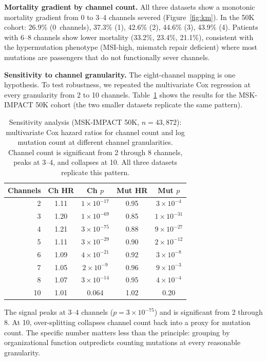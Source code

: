 \documentclass[11pt]{article}
\begin{document}
\textbf{Mortality gradient by channel count.} All three datasets
show a monotonic mortality gradient from 0 to 3--4 channels
severed (Figure~\ref{fig:km}). In the 50K cohort: 26.9\% (0~channels), 37.3\% (1),
42.6\% (2), 44.6\% (3), 43.9\% (4). Patients with 6--8 channels
show lower mortality (33.2\%, 23.4\%, 21.1\%), consistent with the
hypermutation phenotype (MSI-high, mismatch repair deficient) where
most mutations are passengers that do not functionally sever channels.

\textbf{Sensitivity to channel granularity.} The eight-channel mapping
is one hypothesis. To test robustness, we repeated the multivariate
Cox regression at every granularity from 2 to 10 channels.
Table~\ref{tab:sensitivity} shows the results for the MSK-IMPACT
50K cohort (the two smaller datasets replicate the same pattern).

\begin{table}[ht]
\centering
\caption{Sensitivity analysis (MSK-IMPACT 50K, $n = 43{,}872$):
multivariate Cox hazard ratios for channel count and log mutation
count at different channel granularities. Channel count is
significant from 2 through 8 channels, peaks at 3--4, and collapses
at 10. All three datasets replicate this pattern.}
\label{tab:sensitivity}
\medskip
\begin{tabular*}{\textwidth}{@{\extracolsep{\fill}}rcccc@{}}
\toprule
Channels & Ch HR & Ch $p$ & Mut HR & Mut $p$ \\
\midrule
2 & 1.11 & $1 \times 10^{-17}$ & 0.95 & $3 \times 10^{-4}$ \\
3 & 1.20 & $1 \times 10^{-69}$ & 0.85 & $1 \times 10^{-31}$ \\
4 & 1.21 & $3 \times 10^{-75}$ & 0.88 & $9 \times 10^{-27}$ \\
5 & 1.11 & $3 \times 10^{-29}$ & 0.90 & $2 \times 10^{-12}$ \\
6 & 1.09 & $4 \times 10^{-21}$ & 0.92 & $3 \times 10^{-8}$ \\
7 & 1.05 & $2 \times 10^{-9}$ & 0.96 & $9 \times 10^{-3}$ \\
8 & 1.07 & $3 \times 10^{-14}$ & 0.95 & $4 \times 10^{-4}$ \\
10 & 1.01 & 0.064 & 1.02 & 0.20 \\
\bottomrule
\end{tabular*}
\end{table}

The signal peaks at 3--4 channels ($p = 3 \times 10^{-75}$) and is
significant from 2 through 8. At 10, over-splitting collapses
channel count back into a proxy for mutation count. The specific
number matters less than the principle: grouping by organizational
function outpredicts counting mutations at every reasonable
granularity.
\end{document}
